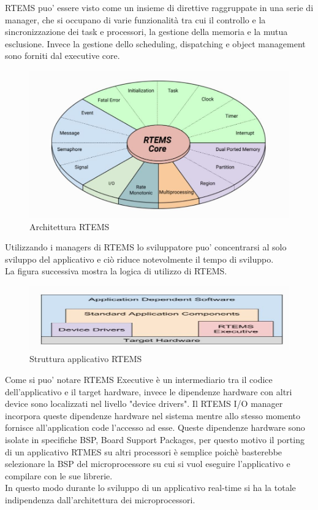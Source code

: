 \documentclass[12pt, a4paper, titlepage, oneside]{book}
\begin{document}
\begin{flushleft}
\newpage
RTEMS puo' essere visto come un insieme di direttive raggruppate in una serie di manager, che si occupano di varie funzionalità tra cui il controllo e la sincronizzazione dei task e processori, la gestione della memoria e la mutua esclusione. Invece la gestione dello scheduling, dispatching e object management sono forniti dal executive core.
\begin{figure} [h]
    \centering
    \includegraphics[scale = 0.80]{rtems_internal_architecture.JPG}
    \caption{Architettura RTEMS}
    \label{fig:my_label1}
\end{figure}

Utilizzando i managers di RTEMS lo sviluppatore puo' concentrarsi al solo sviluppo del applicativo e ciò riduce notevolmente il tempo di sviluppo.\\

La figura successiva mostra la logica di utilizzo di RTEMS.
\begin{figure}[ht]
    \centering
    \includegraphics[scale = 0.80]{application_architecture.JPG}
    \caption{Struttura applicativo RTEMS}
    \label{fig:my_label2}
\end{figure}

Come si puo' notare RTEMS Executive è un intermediario tra il codice dell'applicativo e il target hardware, invece le dipendenze hardware con altri device sono localizzati nel livello "device drivers".
Il RTEMS I/O manager incorpora queste dipendenze hardware nel sistema mentre allo stesso momento fornisce all'application code l'accesso ad esse.
Queste dipendenze hardware sono isolate in specifiche BSP, Board Support Packages, per questo motivo il porting di un applicativo RTMES su altri processori è semplice poichè basterebbe selezionare la BSP del microprocessore su cui si vuol eseguire l'applicativo e compilare con le sue librerie.\\
In questo modo durante lo sviluppo di un applicativo real-time si ha la totale indipendenza dall'architettura dei microprocessori. \\


\end{flushleft}
\end{document}
